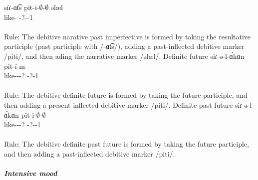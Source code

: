 \begin{exe}
\begin{xlist}
		s\'iɾ-ɑt͡s pit-i-$\emptyset$-$\emptyset$ əlæl \\ 
		like-{\rptcp} {\deb}-?-{\pst}-1{\sg} {\narr} \\ 
		\trans {}\\
		Rule: The debitive narative past imperfective is formed by taking the resultative participle (past participle with /-ɑt͡s/), adding a past-inflected debitive marker /piti/, and then ading the narrative marker /əlæl/.
		\ex Definite future \gll 
		siɾ-ə-l-\'ɑkɑn pit-\'i-m \\ 
		like-{\thgloss}-{\infgloss}-{\futcvb}? {\deb}-?-1{\sg} \\ 
		\trans {}\\
		Rule: The debitive definite future is formed by taking the future participle, and then adding a present-inflected debitive marker /piti/.
		\ex Definite past future \gll 
		siɾ-ə-l-\'ɑkɑn pit-i-$\emptyset$-$\emptyset$ \\ 
		like-{\thgloss}-{\infgloss}-{\futcvb}? {\deb}-?-{\pst}-1{\sg} \\ 
		\trans {}\\
		Rule: The debitive definite past future is formed by taking the future participle, and then adding a past-inflected debitive marker /piti/. 
		
	\end{xlist}
	
	
\end{exe}



\subparagraph{Intensive mood}



